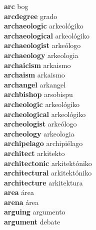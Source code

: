 \textbf{arc } bog \\
\textbf{arcdegree } grado \\
\textbf{archaeologic } arkeológiko \\
\textbf{archaeological } arkeológiko \\
\textbf{archaeologist } arkeólogo \\
\textbf{archaeology } arkeologia \\
\textbf{archaicism } arkaismo \\
\textbf{archaism } arkaismo \\
\textbf{archangel } arkangel \\
\textbf{archbishop } arsobispu \\
\textbf{archeologic } arkeológiko \\
\textbf{archeological } arkeológiko \\
\textbf{archeologist } arkeólogo \\
\textbf{archeology } arkeologia \\
\textbf{archipelago } archipiélago \\
\textbf{architect } arkitekto \\
\textbf{architectonic } arkitektóniko \\
\textbf{architectural } arkitektóniko \\
\textbf{architecture } arkitektura \\
\textbf{area } área \\
\textbf{arena } área \\
\textbf{arguing } argumento \\
\textbf{argument } debate \\
